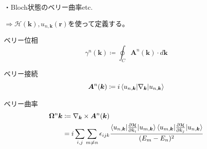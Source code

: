 \documentclass[a4paper,11pt,dvipdfmx]{jsarticle}
\theoremstyle{definition}%
\numberwithin{equation}{section}%
\numberwithin{theorem}{section} %
\begin{document}
・Bloch状態のベリー曲率etc.

\(\Longrightarrow\mathcal{H}(\bm{k}),u_{n,\bm{k}}(\bm{r})\)を使って定義する。

ベリー位相
\begin{equation}
  \gamma^n(\bm{k})\coloneq\oint_C \bm{A}^n(\bm{k})\cdot d\bm{k}
\end{equation}

ベリー接続
\begin{equation}
  \bm{A}^n(\bm{k})\coloneq i\braket{u_{n,\bm{k}}|\nabla_{\bm{k}}|u_{n,\bm{k}}}
\end{equation}

ベリー曲率
\begin{align}
  \bm{\Omega}^n\bm{k}&\coloneq\nabla_{\bm{k}}\times\bm{A}^n(\bm{k}) \\
  &=i\sum_{i,j}\sum_{m\neq n}\epsilon_{ijk}\frac{\braket{u_{n,\bm{k}}|\frac{\partial \mathcal{H}}{\partial k_i}|u_{m,\bm{k}}}\braket{u_{m,\bm{k}}|\frac{\partial \mathcal{H}}{\partial k_j}|u_{n,\bm{k}}}}{(E_m-E_n)^2}
\end{align}
%
%
\end{document}

